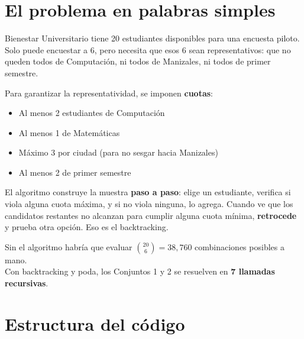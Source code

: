\documentclass[11pt, a4paper]{article}
\begin{document}
\tableofcontents
\newpage

\section{El problema en palabras simples}

Bienestar Universitario tiene 20 estudiantes disponibles para una encuesta piloto. Solo puede encuestar a 6, pero necesita que esos 6 sean representativos: que no queden todos de Computación, ni todos de Manizales, ni todos de primer semestre.

Para garantizar la representatividad, se imponen \textbf{cuotas}:
\begin{itemize}[noitemsep]
  \item Al menos 2 estudiantes de Computación
  \item Al menos 1 de Matemáticas
  \item Máximo 3 por ciudad (para no sesgar hacia Manizales)
  \item Al menos 2 de primer semestre
\end{itemize}

El algoritmo construye la muestra \textbf{paso a paso}: elige un estudiante, verifica si viola alguna cuota máxima, y si no viola ninguna, lo agrega. Cuando ve que los candidatos restantes no alcanzan para cumplir alguna cuota mínima, \textbf{retrocede} y prueba otra opción. Eso es el backtracking.

\vspace{0.3cm}
\begin{tcolorbox}[colback=unalamarillo!15, colframe=unalamarillo!60, title=\textbf{Sin backtracking vs. con backtracking}]
Sin el algoritmo habría que evaluar $\binom{20}{6} = 38{,}760$ combinaciones posibles a mano.\\
Con backtracking y poda, los Conjuntos 1 y 2 se resuelven en \textbf{7 llamadas recursivas}.
\end{tcolorbox}

\section{Estructura del código}
\end{document}
